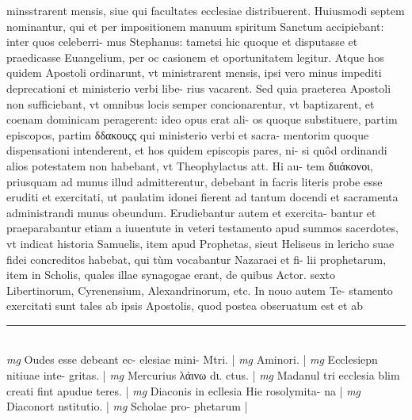 \documentclass{article}
\begin{document}
\begin{pages}
minsstrarent mensis, siue qui facultates ecclesiae distribuerent. Huiusmodi septem nominantur, qui et per impositionem manuum spiritum Sanctum accipiebant: inter quos celeberri- mus Stephanus: tametsi hic quoque et disputasse et praedicasse Euangelium, per oc casionem et oportunitatem legitur. Atque hos quidem Apostoli ordinarunt, vt ministrarent mensis, ipsi vero minus impediti deprecationi et ministerio verbi libe- rius vacarent. Sed quia praeterea Apostoli non sufficiebant, vt omnibus locis semper concionarentur, vt baptizarent, et coenam dominicam peragerent: ideo opus erat ali- os quoque substituere, partim episcopos, partim δδακουςς qui ministerio verbi et sacra- mentorim quoque dispensationi intenderent, et hos quidem episcopis pares, ni- si quôd ordinandi alios potestatem non habebant, vt Theophylactus att. Hi au- tem διιάκονοι, priusquam ad munus illud admitterentur, debebant in facris literis probe esse eruditi et exercitati, ut paulatim idonei fierent ad tantum docendi et sacramenta administrandi munus obeundum. Erudiebantur autem et exercita- bantur et praeparabantur etiam a iuuentute in veteri testamento apud summos sacerdotes, vt indicat historia Samuelis, item apud Prophetas, sieut Heliseus in lericho suae fidei concreditos habebat, qui tùm vocabantur Nazaraei et fi- lii prophetarum, item in Scholis, quales illae synagogae erant, de quibus Actor. sexto Libertinorum, Cyrenensium, Alexandrinorum, etc. In nouo autem Te- stamento exercitati sunt tales ab ipsis Apostolis, quod postea obseruatum est et ab  \pend
\vspace{0.5cm}\noindent
\vspace{0.2cm}\rule{1cm}{0.2pt}\\ 
\hspace{0.2cm}\textit{mg}
\footnotesize Oudes esse debeant ec- elesiae mini- Mtri. 
\normalsize| 
\hspace{0.2cm}\textit{mg}
\footnotesize Aminori. 
\normalsize| 
\hspace{0.2cm}\textit{mg}
\footnotesize Ecclesiepn nitiuae inte- gritas. 
\normalsize| 
\hspace{0.2cm}\textit{mg}
\footnotesize Mercurius λάινω dι. ctus. 
\normalsize| 
\hspace{0.2cm}\textit{mg}
\footnotesize Madanul tri ecclesia blim creati fint apudue teres. 
\normalsize| 
\hspace{0.2cm}\textit{mg}
\footnotesize Diaconis in ecllesia Hie rosolymita- na 
\normalsize| 
\hspace{0.2cm}\textit{mg}
\footnotesize Diaconort nstitutio. 
\normalsize| 
\hspace{0.2cm}\textit{mg}
\footnotesize Scholae pro- phetarum 
\normalsize| 

\end{pages}
\end{document}
